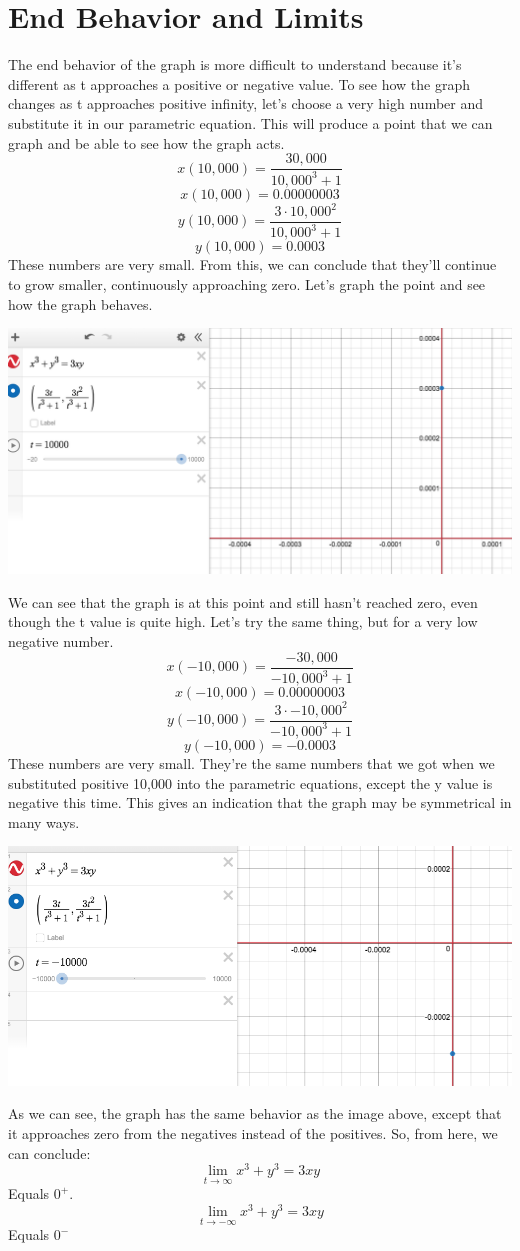 \documentclass[a4paper,openright, 10pt]{article}
\begin{document}
\section*{End Behavior and Limits}
The end behavior of the graph is more difficult to understand because it's different as t approaches a positive or negative value. To see how the graph changes as t approaches positive infinity, let's choose a very high number and substitute it in our parametric equation. This will produce a point that we can graph and be able to see how the graph acts.
$$x(10,000)=\frac{30,000}{10,000^3+1}$$
$$x(10,000)=0.00000003$$
$$y(10,000)=\frac{3\cdot 10,000^2}{10,000^3+1}$$
$$y(10,000)=0.0003$$
These numbers are very small. From this, we can conclude that they'll continue to grow smaller, continuously approaching zero. Let's graph the point and see how the graph behaves.
\begin{center}
    \includegraphics[scale=0.5]{graph3}
\end{center}
We can see that the graph is at this point and still hasn't reached zero, even though the t value is quite high. Let's try the same thing, but for a very low negative number.
$$x(-10,000)=\frac{-30,000}{-10,000^3+1}$$
$$x(-10,000)=0.00000003$$
$$y(-10,000)=\frac{3\cdot -10,000^2}{-10,000^3+1}$$
$$y(-10,000)=-0.0003$$
These numbers are very small. They're the same numbers that we got when we substituted positive 10,000 into the parametric equations, except the y value is negative this time. This gives an indication that the graph may be symmetrical in many ways.
\begin{center}
    \includegraphics[scale=0.5]{graph4}
\end{center}
As we can see, the graph has the same behavior as the image above, except that it approaches zero from the negatives instead of the positives. So, from here, we can conclude:
$$\lim_{t\to\infty} x^3+y^3=3xy$$
Equals $0^+$.
$$\lim_{t\to-\infty} x^3+y^3=3xy$$
Equals $0^-$\\
\end{document}
